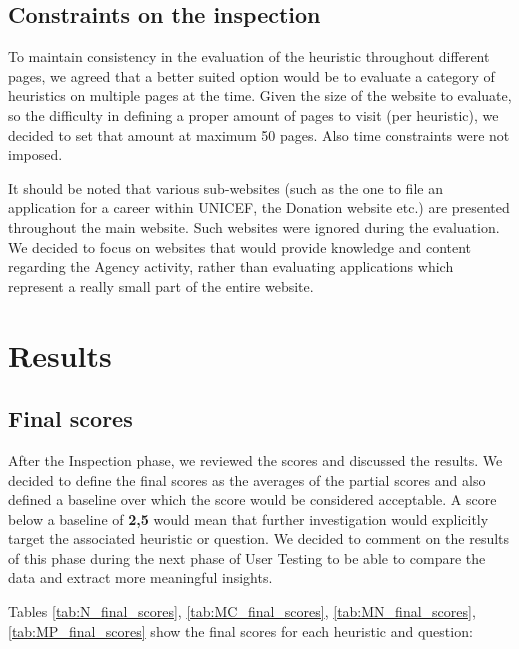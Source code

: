 \subsection{Constraints on the inspection}
To maintain consistency in the evaluation of the heuristic throughout different pages, we agreed that a better suited option would be to evaluate a category of heuristics on multiple pages at the time. Given the size of the website to evaluate, so the difficulty in defining a proper amount of pages to visit (per heuristic), we decided to set that amount at maximum 50 pages. Also time constraints were not imposed.

It should be noted that various sub-websites (such as the one to file an application for a career within UNICEF, the Donation website etc.) are presented throughout the main website. Such websites were ignored during the evaluation. We decided to focus on websites that would provide knowledge and content regarding the Agency activity, rather than evaluating applications which represent a really small part of the entire website.

\pagebreak

\section{Results}
\subsection{Final scores} \label{subsec:final_score}
After the Inspection phase, we reviewed the scores and discussed the results. We decided to define the final scores as the averages of the partial scores and also defined a baseline over which the score would be considered acceptable. A score below a baseline of \textbf{2,5} would mean that further investigation would explicitly target the associated heuristic or question. We decided to comment on the results of this phase during the next phase of User Testing to be able to compare the data and extract more meaningful insights.

Tables \ref{tab:N_final_scores}, \ref{tab:MC_final_scores}, \ref{tab:MN_final_scores}, \ref{tab:MP_final_scores} show the final scores for each heuristic and question:


